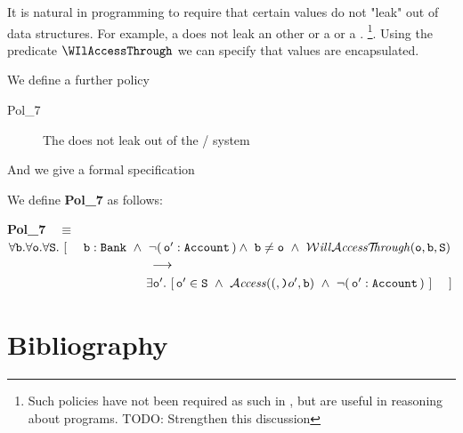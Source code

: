 \documentclass[acmsmall,screen]{acmart}
\begin{document}
It is natural in programming to require that certain values do not "leak" out of data structures. For example,
a  does not leak an other  or a  or a . 
\footnote{Such policies have not been required as such in \cite{Elang}, but are useful in reasoning about programs. TODO: Strengthen this discussion}.
Using the predicate $\WIlAccessThrough$ we can specify that values are encapsulated.

We define a further policy 

\begin{description}
\item[Pol\_7]
The  does not leak out of the / system
\end{description}

And we give a formal specification

\begin{definition}
\label{def:bankNoLEak} We define {\bf {Pol\_7}} as follows:

{\bf {Pol\_7}}\ \  $\equiv$\ \ $\forall \prg{b}.\forall \prg{o}.\forall \prg{S}.\ [ \ \  \ \ \prg{b}:\prg{Bank}\ \wedge\  \neg (\, \prg{o}' : \prg{Account} \, )  \wedge \ \prg{b}\neq \prg{o}\ \wedge \ \WillAccessThrough(\prg{o},\prg{b},\prg{S})  $\\
  $\strut \hspace{4cm}  \longrightarrow$\\
 $\strut \hspace{3.9cm}  \exists \prg{o}'.\ [\, \prg{o}'\in \prg{S}\ \wedge \  \CanAccess( \prg{o}', \prg{b} )\ \wedge\ \neg (\, \prg{o}' : \prg{Account} \, ) \ ] \  \  \ \  ]$

\end{definition}



\section*{Bibliography} 
 
\end{document}
